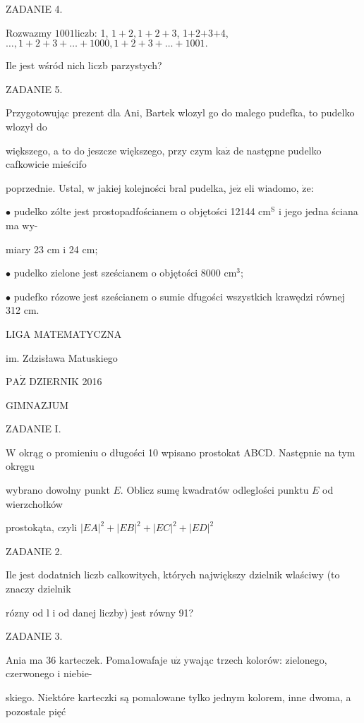 \documentclass[a4paper,12pt]{article}
\begin{document}
ZADANIE 4.

Rozwazmy $1001\mathrm{l}\mathrm{i}\mathrm{c}\mathrm{z}\mathrm{b}$: 1, $1+2, 1+2+3$, 1$+$2$+$3$+$4, $\ldots, 1+2+3+\ldots+1000, 1+2+3+\ldots+1001.$

Ile jest wśród nich liczb parzystych?

ZADANIE 5.

Przygotowując prezent dla Ani, Bartek wlozyl go do malego pudefka, to pudelko wlozył do

większego, a to do jeszcze większego, przy czym $\mathrm{k}\mathrm{a}\dot{\mathrm{z}}$ de następne pudelko cafkowicie mieścifo

poprzednie. Ustal, w jakiej kolejności bral pudelka, $\mathrm{j}\mathrm{e}\dot{\mathrm{z}}$ eli wiadomo, $\dot{\mathrm{z}}\mathrm{e}$:

$\bullet$ pudelko zólte jest prostopadfościanem o objętości 12144 $\mathrm{c}\mathrm{m}^{\mathrm{S}}$ i jego jedna ściana ma wy-

miary 23 cm i 24 cm;

$\bullet$ pudelko zielone jest sześcianem o objętości 8000 $\mathrm{c}\mathrm{m}^{3}$;

$\bullet$ pudefko rózowe jest sześcianem o sumie dfugości wszystkich krawędzi równej 312 cm.






LIGA MATEMATYCZNA

im. Zdzisława Matuskiego

$\mathrm{P}\mathrm{A}\dot{\mathrm{Z}}$ DZIERNIK 2016

GIMNAZJUM

ZADANIE I.

$\mathrm{W}$ okrąg o promieniu o długości 10 wpisano prostokat ABCD. Następnie na tym okręgu

wybrano dowolny punkt $E$. Oblicz sumę kwadratów odleglości punktu $E$ od wierzchołków

prostokąta, czyli $|EA|^{2}+|EB|^{2}+|EC|^{2}+|ED|^{2}$

ZADANIE 2.

Ile jest dodatnich liczb calkowitych, których największy dzielnik wlaściwy (to znaczy dzielnik

rózny od l i od danej liczby) jest równy 91?

ZADANIE 3.

Ania ma 36 karteczek. Poma1owafaje $\mathrm{u}\dot{\mathrm{z}}$ ywając trzech kolorów: zielonego, czerwonego i niebie-

skiego. Niektóre karteczki są pomalowane tylko jednym kolorem, inne dwoma, a pozostale pięć
\end{document}
